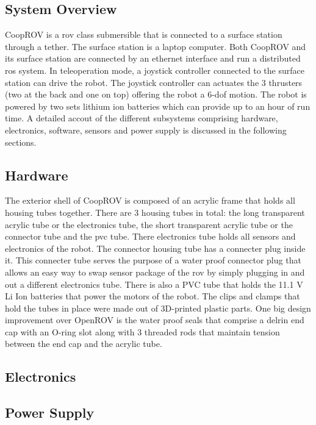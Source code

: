 \documentclass {udthesis}
\begin{document}
\subsection{System Overview}

CoopROV is a \gls{rov} class submersible that is connected to a surface station through a tether. The surface station is a laptop computer. Both CoopROV and its surface station are connected by an ethernet interface and run a distributed \gls{ros} system. In teleoperation mode, a joystick controller connected to the surface station can drive the robot. The joystick controller can actuates the 3 thrusters (two at the back and one on top) offering the robot a 6-\gls{dof} motion. The robot is powered by two sets lithium ion batteries which can provide up to an hour of run time. A detailed accout of the different subsystems comprising hardware, electronics, software, sensors and power supply is discussed in the following sections.

\subsection{Hardware}

The exterior shell of CoopROV is composed of an acrylic frame that holds all housing tubes together. There are 3 housing tubes in total: the long transparent acrylic tube or the electronics tube, the short transparent acrylic tube or the connector tube and the pvc tube. There electronics tube holds all sensors and electronics of the robot. The connector housing tube has a connecter plug inside it. This connecter tube serves the purpose of a water proof connector plug that allows an easy way to swap sensor package of the \gls{rov} by simply plugging in and out a different electronics tube. There is also a PVC tube that holds the 11.1 V Li Ion batteries that power the motors of the robot. The clips and clamps that hold the tubes in place were made out of 3D-printed plastic parts. One big design improvement over OpenROV is the water proof seals that comprise a delrin end cap with an O-ring slot along with 3 threaded rods that maintain tension between the end cap and the acrylic tube. 

\subsection{Electronics}

\subsection{Power Supply}
\end{document}
